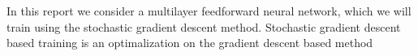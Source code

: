 In this report we consider a multilayer feedforward neural network, which we will train using the stochastic gradient descent method. Stochastic gradient descent based training is an optimalization on the gradient descent based method
